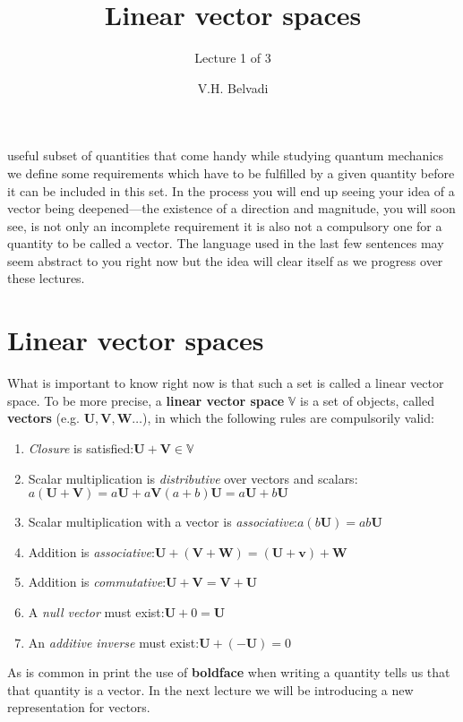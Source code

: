\documentclass[english,seminar,headertitle]{lecture}
\title{Linear vector spaces}
\subtitle{Lecture 1 of 3\vspace*{-1em}}
\author{V.H. Belvadi}
\date{}{}{}
\begin{document}
\noindent{} useful subset of quantities that come handy while studying quantum mechanics we define some requirements which have to be fulfilled by a given quantity before it can be included in this set. In the process you will end up seeing your idea of a vector being deepened---the existence of a direction and magnitude, you will soon see, is not only an incomplete requirement it is also not a compulsory one for a quantity to be called a vector. The language used in the last few sentences may seem abstract to you right now but the idea will clear itself as we progress over these lectures.

\section{Linear vector spaces}

What is important to know right now is that such a set is called a linear vector space. To be more precise, a \textbf{linear vector space} $\mathbb{V}$ is a set of objects, called \textbf{vectors} (e.g. $\mathbf{U, V, W}\ldots$), in which the following rules are compulsorily valid:
\begin{multicols}{2}
\begin{enumerate}
	\item \textit{Closure} is satisfied:\nl$\mathbf{U + V} \in \mathbb{V}$
	\item Scalar multiplication is \textit{distributive} over vectors and scalars:\nl$a\left(\mathbf{U + V}\right) = a\mathbf{U} + a\mathbf{V}$\nl$\left(a + b\right)\mathbf{U} = a\mathbf{U} + b\mathbf{U}$
	\item Scalar multiplication with a vector is \textit{associative}:\nl$a\left(b\mathbf{U}\right) = ab\mathbf{U} $
	\item Addition is \textit{associative}:\nl$\mathbf{U + \left(V + W\right) = \left(U + v\right) + W}$
	\item Addition is \textit{commutative}:\nl$\mathbf{U + V} = \mathbf{V + U}$
	\item A \textit{null vector} must exist:\nl$\mathbf{U} + 0 = \mathbf{U}$
	\item An \textit{additive inverse} must exist:\nl$\mathbf{U + (-U)} = 0$
\end{enumerate}
\end{multicols}

As is common in print the use of \textbf{boldface} when writing a quantity tells us that that quantity is a vector. In the next lecture we will be introducing a new representation for vectors.
\end{document}
